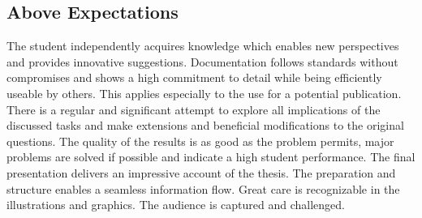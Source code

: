 \documentclass{article}
\begin{document}
\subsection*{Above Expectations}
The student independently acquires knowledge which enables new perspectives and provides innovative suggestions. Documentation follows standards without compromises and shows a high commitment to detail while being efficiently useable by others. This applies especially to the use for a potential publication.
There is a regular and significant attempt to explore all  implications of the discussed tasks and make extensions and beneficial modifications to the original questions.
The quality of the results is as good as the problem permits, major problems are solved if possible and indicate a high student performance.
The final presentation delivers an impressive account of the thesis. The preparation and structure enables a seamless information flow. Great care is recognizable in the illustrations and graphics. The audience is captured and challenged.



\end{document}

